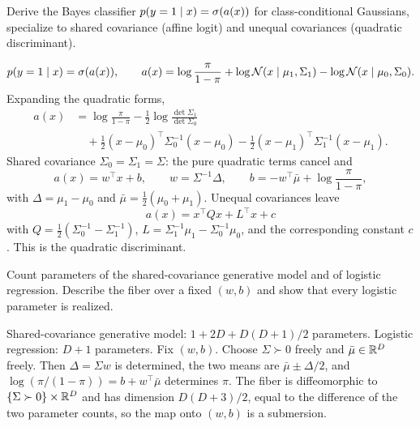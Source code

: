 \begin{hwqbox}
Derive the Bayes classifier $p(y=1\mid x)=\sigma(a(x))$ for class-conditional Gaussians, specialize to shared covariance (affine logit) and unequal covariances (quadratic discriminant).
\end{hwqbox}
\begin{hwsolbox}
\[
p(y=1\mid x)=\sigma(a(x)),\qquad
a(x)=\log\frac{\pi}{1-\pi}+\log\mathcal{N}(x\mid\mu_1,\Sigma_1)-\log\mathcal{N}(x\mid\mu_0,\Sigma_0).
\]
Expanding the quadratic forms,
\begin{align*}
a(x)&=\log\frac{\pi}{1-\pi}-\tfrac12\log\frac{\det\Sigma_1}{\det\Sigma_0}\\
&\quad+\tfrac12(x-\mu_0)^\top\Sigma_0^{-1}(x-\mu_0)-\tfrac12(x-\mu_1)^\top\Sigma_1^{-1}(x-\mu_1).
\end{align*}
Shared covariance $\Sigma_0=\Sigma_1=\Sigma$: the pure quadratic terms cancel and
\[
a(x)=w^\top x+b,\qquad
w=\Sigma^{-1}\Delta,\qquad
b=-w^\top\bar\mu+\log\frac{\pi}{1-\pi},
\]
with $\Delta=\mu_1-\mu_0$ and $\bar\mu=\tfrac12(\mu_0+\mu_1)$. Unequal covariances leave
\[
a(x)=x^\top Q x+L^\top x+c
\]
with $Q=\tfrac12(\Sigma_0^{-1}-\Sigma_1^{-1})$, $L=\Sigma_1^{-1}\mu_1-\Sigma_0^{-1}\mu_0$, and the corresponding constant $c$. This is the quadratic discriminant.
\end{hwsolbox}

\begin{hwqbox}
Count parameters of the shared-covariance generative model and of logistic regression. Describe the fiber over a fixed $(w,b)$ and show that every logistic parameter is realized.
\end{hwqbox}
\begin{hwsolbox}
Shared-covariance generative model: $1+2D+D(D+1)/2$ parameters. Logistic regression: $D+1$ parameters. Fix $(w,b)$. Choose $\Sigma\succ 0$ freely and $\bar\mu\in\mathbb{R}^D$ freely. Then $\Delta=\Sigma w$ is determined, the two means are $\bar\mu\pm\Delta/2$, and $\log(\pi/(1-\pi))=b+w^\top\bar\mu$ determines $\pi$. The fiber is diffeomorphic to $\{\Sigma\succ 0\}\times\mathbb{R}^D$ and has dimension $D(D+3)/2$, equal to the difference of the two parameter counts, so the map onto $(w,b)$ is a submersion.
\end{hwsolbox}

